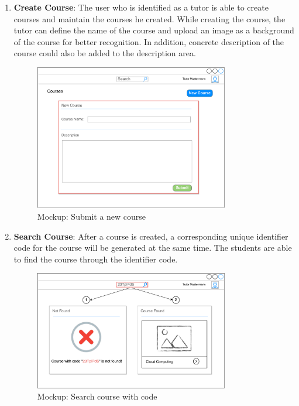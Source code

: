 \begin{enumerate}
\item
\textbf{Create Course}: The user who is identified as a tutor is able to create courses and maintain the courses he created. While creating the course, the tutor can define the name of the course and upload an image as a background of the course for better recognition. In addition, concrete description of the course could also be added to the description area.

\begin{figure}[!htbp]
  \centering
    \includegraphics[width=0.8\textwidth]{Figures/mockup/add-new-course.pdf}
  \caption{Mockup: Submit a new course}
\end{figure}


\item
\textbf{Search Course}: After a course is created, a corresponding unique identifier code for the course will be generated at the same time. The students are able to find the course through the identifier code.

\begin{figure}[!htbp]
  \centering
    \includegraphics[width=0.8\textwidth]{Figures/mockup/Search-Course.pdf}
  \caption{Mockup: Search course with code}
\end{figure}


\end{enumerate}
